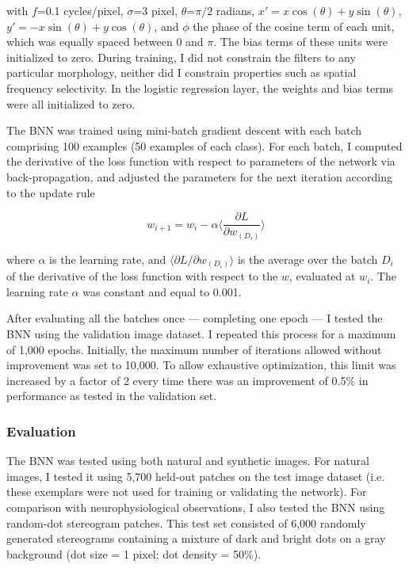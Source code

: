 with $f$=0.1 cycles/pixel, $\sigma$=3 pixel, $\theta$=$\pi/2$ radians, $x'=x \cos (\theta)+y \sin (\theta)$, $y'=-x \sin (\theta) + y \cos (\theta)$, and $\phi$  the phase of the cosine term of each unit, which was equally spaced between $0$ and $\pi$. The bias terms of these units were initialized to zero. During training, I did not constrain the filters to any particular morphology, neither did I constrain properties such as spatial frequency selectivity. In the logistic regression layer, the weights and bias terms were all initialized to zero. 

The BNN was trained using mini-batch gradient descent with each batch comprising 100 examples (50 examples of each class). For each batch, I computed the derivative of the loss function with respect to parameters of the network via back-propagation, and adjusted the parameters for the next iteration according to the update rule

\begin{equation}
  w_{i+1}=w_i - \alpha \Bigg \langle \frac{\partial L}{\partial w_{(D_i)}} \Bigg \rangle
\end{equation}

where $\alpha$ is the learning rate, and $ \big \langle \partial L/ \partial w_{(D_i)}\big \rangle$ is the average over the batch $D_i$ of the derivative of the loss function with respect to the $w$, evaluated at $w_i$. The learning rate $\alpha$ was constant and equal to 0.001. 

After evaluating all the batches once --- completing one epoch --- I tested the BNN using the validation image dataset. I repeated this process for a maximum of 1,000 epochs. Initially, the maximum number of iterations allowed without improvement was set to 10,000. To allow exhaustive optimization, this limit was increased by a factor of 2 every time there was an improvement of 0.5\% in performance as tested in the validation set.

\subsubsection*{Evaluation}

The BNN was tested using both natural and synthetic images. For natural images, I tested it using 5,700 held-out patches on the test image dataset (i.e. these exemplars were not used for training or validating the network). For comparison with neurophysiological observations, I also tested the BNN using random-dot stereogram patches. This test set consisted of 6,000 randomly generated stereograms containing a mixture of dark and bright dots on a gray background (dot size = 1 pixel; dot density = 50\%). 

